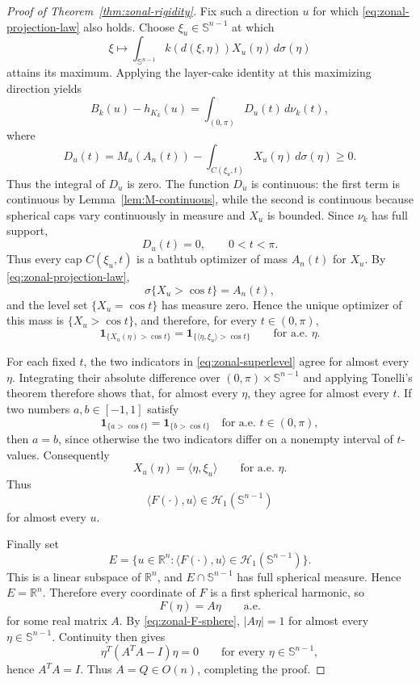 \documentclass[11pt,reqno]{amsart}
\theoremstyle{remark}
\begin{document}
\begin{proof}[Proof of Theorem~\ref{thm:zonal-rigidity}]
Fix such a direction $u$ for which
\eqref{eq:zonal-projection-law} also holds.  Choose
$\xi_u\in\mathbb S^{n-1}$ at which
\[
 \xi\longmapsto
 \int_{\mathbb S^{n-1}} k(d(\xi,\eta))X_u(\eta)\,d\sigma(\eta)
\]
attains its maximum.  Applying the layer-cake identity at this maximizing
direction yields
\[
 B_k(u)-h_{K_k}(u)
 =
 \int_{(0,\pi)}D_u(t)\,d\nu_k(t),
\]
where
\[
 D_u(t)
 =
 M_u(A_n(t))
 -
 \int_{C(\xi_u,t)}X_u(\eta)\,d\sigma(\eta)
 \ge0.
\]
Thus the integral of $D_u$ is zero.  The function $D_u$ is continuous:
the first term is continuous by Lemma~\ref{lem:M-continuous}, while the
second is continuous because spherical caps vary continuously in measure
and $X_u$ is bounded.  Since $\nu_k$ has full support,
\[
 D_u(t)=0,\qquad0<t<\pi.
\]
Thus every cap $C(\xi_u,t)$ is a bathtub optimizer of mass $A_n(t)$ for
$X_u$.  By \eqref{eq:zonal-projection-law},
\[
 \sigma\{X_u>\cos t\}=A_n(t),
\]
and the level set $\{X_u=\cos t\}$ has measure zero.  Hence the unique
optimizer of this mass is $\{X_u>\cos t\}$, and therefore, for every
$t\in(0,\pi)$,
\begin{equation}\label{eq:zonal-superlevel}
 \mathbf1_{\{X_u(\eta)>\cos t\}}
 =
 \mathbf1_{\{\langle\eta,\xi_u\rangle>\cos t\}}
 \qquad\text{for a.e. }\eta.
\end{equation}

For each fixed $t$, the two indicators in
\eqref{eq:zonal-superlevel} agree for almost every $\eta$.  Integrating
their absolute difference over $(0,\pi)\times\mathbb S^{n-1}$ and applying
Tonelli's theorem therefore shows that, for almost every $\eta$, they agree
for almost every $t$.  If two numbers $a,b\in[-1,1]$ satisfy
\[
 \mathbf1_{\{a>\cos t\}}=\mathbf1_{\{b>\cos t\}}
 \quad\text{for a.e. }t\in(0,\pi),
\]
then $a=b$, since otherwise the two indicators differ on a nonempty interval
of $t$-values.  Consequently
\[
 X_u(\eta)=\langle\eta,\xi_u\rangle
 \qquad\text{for a.e. }\eta.
\]
Thus
\[
 \langle F(\cdot),u\rangle
 \in\mathcal H_1(\mathbb S^{n-1})
\]
for almost every $u$.

Finally set
\[
 E=
 \{u\in\mathbb R^n:
 \langle F(\cdot),u\rangle\in\mathcal H_1(\mathbb S^{n-1})\}.
\]
This is a linear subspace of $\mathbb R^n$, and
$E\cap\mathbb S^{n-1}$ has full spherical measure.  Hence $E=\mathbb R^n$.
Therefore every coordinate of $F$ is a first spherical harmonic, so
\[
 F(\eta)=A\eta
 \qquad\text{a.e.}
\]
for some real matrix $A$.  By \eqref{eq:zonal-F-sphere},
$|A\eta|=1$ for almost every $\eta\in\mathbb S^{n-1}$.  Continuity then
gives
\[
 \eta^T(A^TA-I)\eta=0
 \qquad\text{for every }\eta\in\mathbb S^{n-1},
\]
hence $A^TA=I$.  Thus $A=Q\in O(n)$, completing the proof.
\end{proof}
\end{document}
